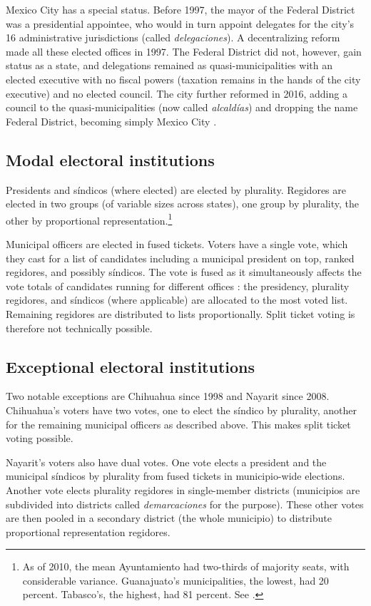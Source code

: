 \documentclass[letter,12pt]{article}
\begin{document}
Mexico City has a special status. Before 1997, the mayor of the Federal District was a presidential appointee, who would in turn appoint delegates for the city's 16 administrative jurisdictions (called \emph{delegaciones}). A decentralizing reform made all these elected offices in 1997. The Federal District did not, however, gain status as a state, and delegations remained as quasi-municipalities with an elected executive with no fiscal powers (taxation remains in the hands of the city executive) and no elected council. The city further reformed in 2016, adding a council to the quasi-municipalities (now called \emph{alcaldías}) and dropping the name Federal District, becoming simply Mexico City \citep{rabell.2017}.

\subsection{Modal electoral institutions}
Presidents and síndicos (where elected) are elected by plurality. Regidores are elected in two groups (of variable sizes across states), one group by plurality, the other by proportional representation.\footnote{As of 2010, the mean Ayuntamiento had two-thirds of majority seats, with considerable variance. Guanajuato's municipalities, the lowest, had 20 percent. Tabasco's, the highest, had 81 percent. See \citet[][:14]{gil.2010}.} 

Municipal officers are elected in fused tickets. Voters have a single vote, which they cast for a list of candidates including a municipal president on top, ranked regidores, and possibly síndicos. The vote is fused as it simultaneously affects the vote totals of candidates running for different offices \citep[see ][:42]{cox.1997}: the presidency, plurality regidores, and síndicos (where applicable) are allocated to the most voted list. Remaining regidores are distributed to lists proportionally. Split ticket voting is therefore not technically possible.

\subsection{Exceptional electoral institutions}
Two notable exceptions are Chihuahua since 1998 and Nayarit since 2008. Chihuahua's voters have two votes, one to elect the síndico by plurality, another for the remaining municipal officers as described above. This makes split ticket voting possible. 

Nayarit's voters also have dual votes. One vote elects a president and the municipal síndicos by plurality from fused tickets in municipio-wide elections. Another vote elects plurality regidores in single-member districts (municipios are subdivided into districts called \emph{demarcaciones} for the purpose). These other votes are then pooled in a secondary district (the whole municipio) to distribute proportional representation regidores.
\end{document}
